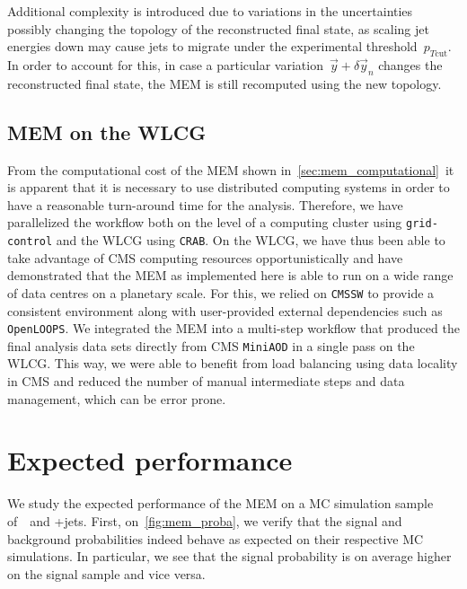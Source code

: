 Additional complexity is introduced due to variations in the uncertainties possibly changing the topology of the reconstructed final state, as scaling jet energies down may cause jets to migrate under the experimental threshold~$p_{T\mathrm{cut}}$. In order to account for this, in case a particular variation~$\vec{y} + \delta \vec{y}_n$ changes the reconstructed final state, the MEM is still recomputed using the new topology.

\subsection{MEM on the WLCG}

From the computational cost of the MEM shown in~\cref{sec:mem_computational}~it is apparent that it is necessary to use distributed computing systems in order to have a reasonable turn-around time for the analysis. Therefore, we have parallelized the workflow both on the level of a computing cluster using \texttt{grid-control} and the WLCG using \texttt{CRAB}. On the WLCG, we have thus been able to take advantage of CMS computing resources opportunistically and have demonstrated that the MEM as implemented here is able to run on a wide range of data centres on a planetary scale. For this, we relied on \texttt{CMSSW} to provide a consistent environment along with user-provided external dependencies such as \texttt{OpenLOOPS}. We integrated the MEM into a multi-step workflow that produced the final analysis data sets directly from CMS \texttt{MiniAOD} in a single pass on the WLCG. This way, we were able to benefit from load balancing using data locality in CMS and reduced the number of manual intermediate steps and data management, which can be error prone.

\section{Expected performance}
We study the expected performance of the MEM on a MC simulation sample of~\ttHbb~and \ttbar+jets. First, on~\cref{fig:mem_proba}, we verify that the signal and background probabilities indeed behave as expected on their respective MC simulations. In particular, we see that the signal probability is on average higher on the signal sample and vice versa.

